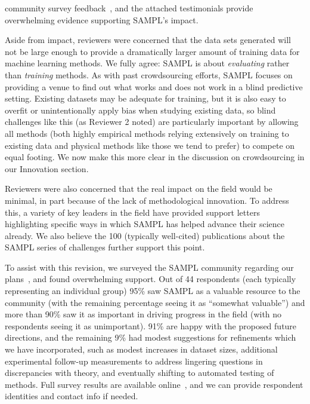 \documentclass[11pt]{article}
\begin{document}
community survey feedback~\cite{Mobley:2017:eScholarship}, and the attached testimonials provide overwhelming evidence supporting SAMPL's impact.

Aside from impact, reviewers were concerned that the data sets generated will not be large enough to provide a dramatically larger amount of training data for machine learning methods. 
We fully agree: SAMPL is about \emph{evaluating} rather than \emph{training} methods.
As with past crowdsourcing efforts, SAMPL focuses on providing a venue to find out what works and does not work in a blind predictive setting.
Existing datasets may be adequate for training, but it is also easy to overfit or unintentionally apply bias when studying existing data, so blind challenges like this (as Reviewer 2 noted) are particularly important by allowing all methods (both highly empirical methods relying extensively on training to existing data and physical methods like those we tend to prefer) to compete on equal footing.
We now make this more clear in the discussion on crowdsourcing in our Innovation section.

Reviewers were also concerned that the real impact on the field would be minimal, in part because of the lack of methodological innovation.
To address this, a variety of key leaders in the field have provided support letters highlighting specific ways in which SAMPL has helped advance their science already. 
We also believe the 100 (typically well-cited) publications about the SAMPL series of challenges further support this point.

To assist with this revision, we surveyed the SAMPL community regarding our plans~\cite{Mobley:2017:eScholarship}, and found overwhelming support. 
Out of 44 respondents (each typically representing an individual group) 95\% saw SAMPL as a valuable resource to the community (with the remaining percentage seeing it as ``somewhat valuable'') and more than 90\% saw it as important in driving progress in the field (with no respondents seeing it as unimportant). 
91\% are happy with the proposed future directions, and the remaining 9\% had modest suggestions for refinements which we have incorporated, such as modest increases in dataset sizes, additional experimental follow-up measurements to address lingering questions in discrepancies with theory, and eventually shifting to automated testing of methods. 
Full survey results are available online~\cite{Mobley:2017:eScholarship}, and we can provide respondent identities and contact info if needed.
\end{document}
